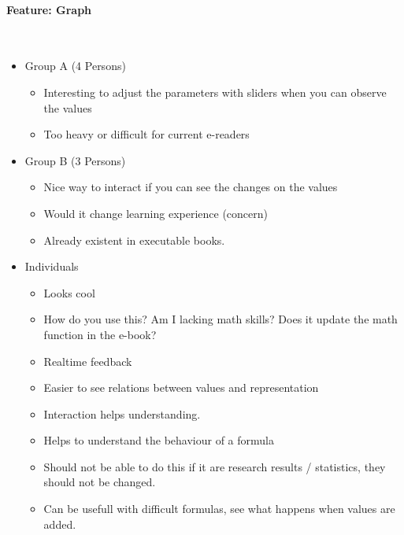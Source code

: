 \documentclass[main.tex]{subfiles}
\begin{document}
\paragraph{Feature: Graph}~
\begin{itemize}
	\item Group A (4 Persons)
		\begin{itemize}
			\item Interesting to adjust the parameters with sliders when you can observe the values
			\item Too heavy or difficult for current e-readers
		\end{itemize}
	\item Group B (3 Persons)
		\begin{itemize}
			\item Nice way to interact if you can see the changes on the values
			\item Would it change learning experience (concern)
			\item Already existent in executable books.
		\end{itemize}
	\item Individuals
		\begin{itemize}
      \item Looks cool %
      \item How do you use this? Am I lacking math skills? Does it update the math function in the e-book? %
			\item Realtime feedback
			\item Easier to see relations between values and representation
			\item Interaction helps understanding.
			\item Helps to understand the behaviour of a formula
 			\item Should not be able to do this if it are research results / statistics, they should not be changed. 
			\item Can be usefull with difficult formulas, see what happens when values are added.
		\end{itemize}
\end{itemize}
\end{document}
